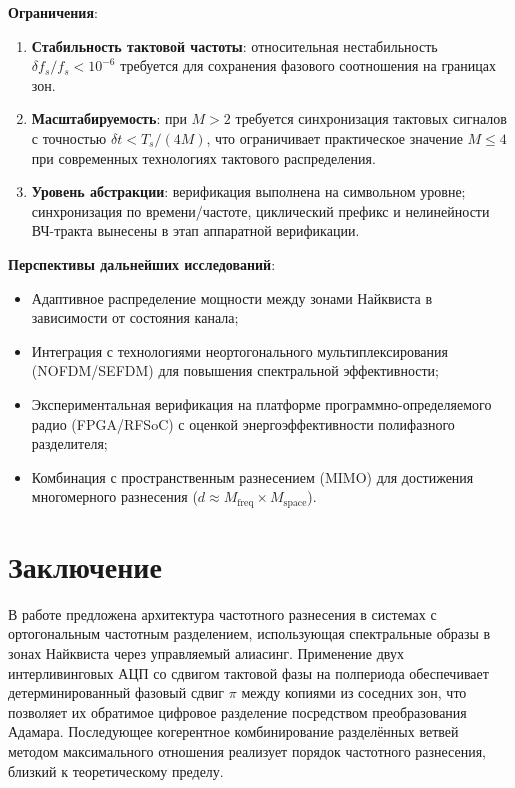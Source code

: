 \documentclass[a4paper,12pt]{article}
\numberwithin{equation}{section}
\begin{document}
\textbf{Ограничения}:
\begin{enumerate}
    \item \textbf{Стабильность тактовой частоты}: относительная нестабильность $\delta f_s/f_s < 10^{-6}$ требуется для сохранения фазового соотношения на границах зон.
    \item \textbf{Масштабируемость}: при $M > 2$ требуется синхронизация тактовых сигналов с точностью $\delta t < T_s/(4M)$, что ограничивает практическое значение $M \le 4$ при современных технологиях тактового распределения.
    \item \textbf{Уровень абстракции}: верификация выполнена на символьном уровне; синхронизация по времени/частоте, циклический префикс и нелинейности ВЧ-тракта вынесены в этап аппаратной верификации.
\end{enumerate}

\textbf{Перспективы дальнейших исследований}:
\begin{itemize}
    \item Адаптивное распределение мощности между зонами Найквиста в зависимости от состояния канала;
    \item Интеграция с технологиями неортогонального мультиплексирования (NOFDM/SEFDM) для повышения спектральной эффективности;
    \item Экспериментальная верификация на платформе программно-определяемого радио (FPGA/RFSoC) с оценкой энергоэффективности полифазного разделителя;
    \item Комбинация с пространственным разнесением (MIMO) для достижения многомерного разнесения ($d \approx M_\text{freq} \times M_\text{space}$).
\end{itemize}

\section{Заключение}
\label{sec:conclusion}

В работе предложена архитектура частотного разнесения в системах с ортогональным частотным разделением, использующая спектральные образы в зонах Найквиста через управляемый алиасинг. Применение двух интерливинговых АЦП со сдвигом тактовой фазы на полпериода обеспечивает детерминированный фазовый сдвиг $\pi$ между копиями из соседних зон, что позволяет их обратимое цифровое разделение посредством преобразования Адамара. Последующее когерентное комбинирование разделённых ветвей методом максимального отношения реализует порядок частотного разнесения, близкий к теоретическому пределу.
\end{document}
